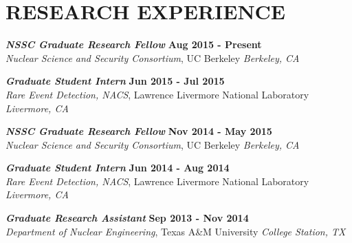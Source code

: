 \section{\small{RESEARCH EXPERIENCE}}

{\sl\bf NSSC Graduate Research Fellow} \hfill {\bf Aug 2015 - Present} \\
{\sl Nuclear Science and Security Consortium}, UC Berkeley \hfill {\sl Berkeley, CA}
\vspace{-5pt}

{\sl\bf Graduate Student Intern} \hfill {\bf Jun 2015 - Jul 2015} \\
{\sl Rare Event Detection, NACS}, Lawrence Livermore National Laboratory \hfill {\sl Livermore, CA}
\vspace{-5pt}

{\sl\bf NSSC Graduate Research Fellow} \hfill {\bf Nov 2014 - May 2015} \\
{\sl Nuclear Science and Security Consortium}, UC Berkeley \hfill {\sl Berkeley, CA}
\vspace{-5pt}
 
{\sl\bf Graduate Student Intern} \hfill {\bf Jun 2014 - Aug 2014} \\
{\sl Rare Event Detection, NACS}, Lawrence Livermore National Laboratory \hfill {\sl Livermore, CA}
\vspace{-5pt}

{\sl\bf Graduate Research Assistant} \hfill {\bf Sep 2013 - Nov 2014} \\
{\sl Department of Nuclear Engineering}, Texas A\&M University \hfill {\sl College Station, TX}
